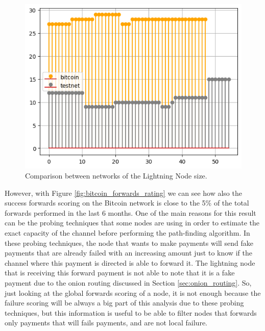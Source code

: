 \begin{figure}[H]
    \begin{center}
      \includegraphics[scale=0.7]{imgs/bitcoin_vs_testnet_channels_size.png}
    \end{center}
    \caption{Comparison between networks of the Lightning Node size.}
    \label{fig:bitcoin_vs_testnet_channels_size}
\end{figure}

However, with Figure \ref{fig:bitcoin_forwards_rating} we can see how also the success forwards scoring 
on the Bitcoin network is close to the 5\% of the total forwards performed in the last 6 months. One of the main 
reasons for this result can be the probing techniques that some nodes are using in order to estimate the exact capacity
of the channel before performing the path-finding algorithm. In these probing techniques, the node that wants to make payments
will send fake payments that are already failed with an increasing amount just to know if the channel where this 
payment is directed is able to forward it. The lightning node that is receiving this forward payment is not able to 
note that it is a fake payment due to the onion routing discussed in Section \ref{sec:onion_routing}.
So, just looking at the global forwards scoring 
of a node, it is not enough because the failure scoring will be always a big part of this analysis due to 
these probing techniques, but this information is useful to be able to filter nodes that forwards only payments 
that will fails payments, and are not local failure.


